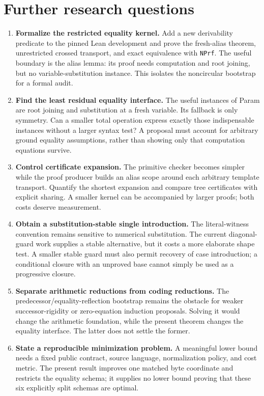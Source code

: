 \section{Further research questions}

\begin{enumerate}
\item \textbf{Formalize the restricted equality kernel.}
Add a new derivability predicate to the pinned Lean development and prove
the fresh-alias theorem, unrestricted crossed transport, and exact
equivalence with \texttt{NPrf}. The useful boundary is the alias lemma:
its proof needs computation and root joining, but no variable-substitution
instance. This isolates the noncircular bootstrap for a formal audit.

\item \textbf{Find the least residual equality interface.}
The useful instances of Param are root joining and substitution at a
fresh variable. Its fallback is only symmetry. Can a smaller total
operation express exactly those indispensable instances without a larger
syntax test? A proposal must account for arbitrary ground equality
assumptions, rather than showing only that computation equations survive.

\item \textbf{Control certificate expansion.}
The primitive checker becomes simpler while the proof producer builds an
alias scope around each arbitrary template transport. Quantify the
shortest expansion and compare tree certificates with explicit sharing.
A smaller kernel can be accompanied by larger proofs; both costs deserve
measurement.

\item \textbf{Obtain a substitution-stable single introduction.}
The literal-witness convention remains sensitive to numerical
substitution. The current diagonal-guard work supplies a stable alternative,
but it costs a more elaborate shape test. A smaller stable guard must also
permit recovery of case introduction; a conditional closure with an
unproved base cannot simply be used as a progressive closure.

\item \textbf{Separate arithmetic reductions from coding reductions.}
The predecessor/equality-reflection bootstrap remains the obstacle for
weaker successor-rigidity or zero-equation induction proposals. Solving it
would change the arithmetic foundation, while the present theorem changes
the equality interface. The latter does not settle the former.

\item \textbf{State a reproducible minimization problem.}
A meaningful lower bound needs a fixed public contract, source language,
normalization policy, and cost metric. The present result improves one
matched byte coordinate and restricts the equality schema; it supplies no
lower bound proving that these six explicitly split schemas are optimal.
\end{enumerate}

